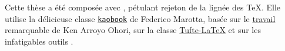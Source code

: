 \vspace*{\fill}

\begin{center}
	Cette thèse a été composée avec \href{https://tug.org/xetex/}{\XeLaTeX}, 
	pétulant rejeton de la lignée des \TeX. Elle utilise la délicieuse classe 
	\href{https://github.com/fmarotta/kaobook}{\texttt{kaobook}} de Federico 
	Marotta, basée sur le \href{https://github.com/kenohori/thesis}{travail} 
	remarquable de Ken Arroyo Ohori, sur la classe 
	\href{https://github.com/Tufte-LaTeX/tufte-latex}{Tufte-\LaTeX} et sur les 
	infatigables outils \href{https://komascript.de/}{\KOMAScript}.
\end{center}